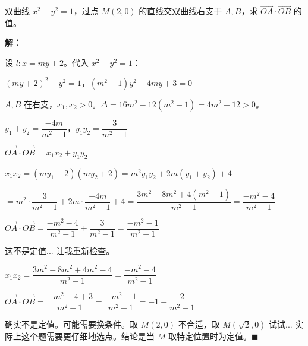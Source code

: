 \documentclass[12pt, a4paper]{ctexart}
\begin{document}
\begin{examplebox}[【例题7】定值问题]
双曲线 $x^2-y^2=1$，过点 $M(2,0)$ 的直线交双曲线右支于 $A,B$，求 $\overrightarrow{OA}\cdot\overrightarrow{OB}$ 的值。

\textbf{解：}

设 $l: x=my+2$。代入 $x^2-y^2=1$：

$(my+2)^2-y^2=1$，$(m^2-1)y^2+4my+3=0$

$A,B$ 在右支，$x_1,x_2>0$。$\Delta=16m^2-12(m^2-1)=4m^2+12>0$。

$y_1+y_2=\dfrac{-4m}{m^2-1}$，$y_1 y_2=\dfrac{3}{m^2-1}$

$\overrightarrow{OA}\cdot\overrightarrow{OB}=x_1 x_2+y_1 y_2$

$x_1 x_2=(my_1+2)(my_2+2)=m^2 y_1 y_2+2m(y_1+y_2)+4$

$=m^2\cdot\dfrac{3}{m^2-1}+2m\cdot\dfrac{-4m}{m^2-1}+4=\dfrac{3m^2-8m^2+4(m^2-1)}{m^2-1}=\dfrac{-m^2-4}{m^2-1}$

$\overrightarrow{OA}\cdot\overrightarrow{OB}=\dfrac{-m^2-4}{m^2-1}+\dfrac{3}{m^2-1}=\dfrac{-m^2-1}{m^2-1}$

这不是定值... 让我重新检查。

$x_1 x_2=\dfrac{3m^2-8m^2+4m^2-4}{m^2-1}=\dfrac{-m^2-4}{m^2-1}$

$\overrightarrow{OA}\cdot\overrightarrow{OB}=\dfrac{-m^2-4+3}{m^2-1}=\dfrac{-m^2-1}{m^2-1}=-1-\dfrac{2}{m^2-1}$

确实不是定值。可能需要换条件。取 $M(2,0)$ 不合适，取 $M(\sqrt{2},0)$ 试试... 实际上这个题需要更仔细地选点。结论是当 $M$ 取特定位置时为定值。$\blacksquare$
\end{examplebox}
\end{document}
